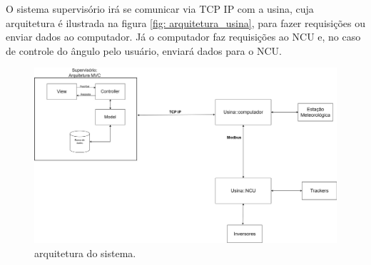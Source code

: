 \documentclass[a4paper,12pt]{article}
\begin{document}
O sistema supervisório irá se comunicar via TCP IP com a usina, cuja arquitetura é ilustrada na figura \ref{fig: arquitetura_usina}, para fazer requisições ou enviar dados ao computador. Já o computador faz requisições ao NCU e, no caso de controle do ângulo pelo usuário, enviará dados para o NCU.
\begin{figure} [htbp]
    \begin{center}
            \includegraphics[width=15.5cm]{Imagem/arquitetura_sistema.jpg}
    \caption{arquitetura do sistema.}
    \label{fig: arquitetura_sistema}

    \end{center}
\end{figure}

\clearpage
\printglossary[type=\acronymtype]
\printglossary
\end{document}
